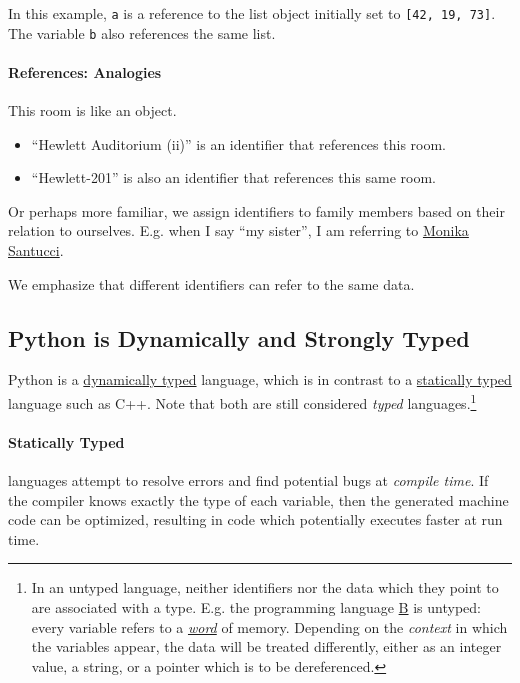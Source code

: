 \documentclass[12pt,letterpaper,twoside]{article}
\begin{document}
\begin{enumerate}
In this example, \texttt{a} is a reference to the list object initially
set to \texttt{{[}42,\ 19,\ 73{]}}. The variable \texttt{b} also
references the same list.

\paragraph{References: Analogies}   This room is like an object.
\begin{itemize}
\item
  ``Hewlett Auditorium (ii)'' is an identifier that references this room.
\item
  ``Hewlett-201'' is also an identifier that references this same room.
\end{itemize}

Or perhaps more familiar, we assign identifiers to family members based on their relation
to ourselves. E.g. when I say ``my sister'', I am referring to 
\href{https://soundcloud.com/monikasantucci}{Monika Santucci}.

We emphasize that different identifiers can refer to the same data.

\vspace{-3ex}
\subsection{Python is Dynamically and Strongly Typed}
Python is a 
\href{https://en.wikipedia.org/wiki/Type_system#Dynamic_type_checking_and_runtime_type_information}{dynamically typed} 
language, which is in contrast to a 
\href{https://en.wikipedia.org/wiki/Type_system#Static_type_checking}{statically typed} language such as C++. 
Note that both are still considered \emph{typed} languages.\footnote{In an untyped language, neither identifiers
nor the data which they point to are associated with a type. E.g. the programming language \href{https://en.wikipedia.org/wiki/B_(programming_language)#History}{B} is untyped: every variable refers to a \href{https://en.wikipedia.org/wiki/Word_(computer_architecture)}{\emph{word}} of memory. Depending on the \emph{context}
in which the variables appear, the data will be treated differently, either as an integer value, a string, or a pointer which is to be dereferenced.}

\paragraph{Statically Typed} languages attempt to resolve errors and find potential bugs at \emph{compile time}.
If the compiler knows exactly the type of each variable, then the generated machine code can be optimized, resulting in code which potentially executes faster
at run time. 


\end{enumerate}
\end{document}
